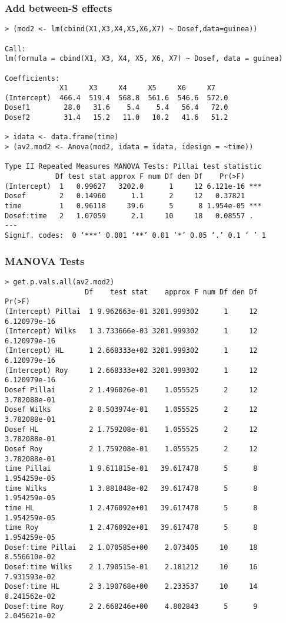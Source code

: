 \begin{frame}\frametitle{Add between-S effects}\scriptsize
\begin{verbatim}
> (mod2 <- lm(cbind(X1,X3,X4,X5,X6,X7) ~ Dosef,data=guinea))

Call:
lm(formula = cbind(X1, X3, X4, X5, X6, X7) ~ Dosef, data = guinea)

Coefficients:
             X1     X3     X4     X5     X6     X7   
(Intercept)  466.4  519.4  568.8  561.6  546.6  572.0
Dosef1        28.0   31.6    5.4    5.4   56.4   72.0
Dosef2        31.4   15.2   11.0   10.2   41.6   51.2

> idata <- data.frame(time)
> (av2.mod2 <- Anova(mod2, idata = idata, idesign = ~time))

Type II Repeated Measures MANOVA Tests: Pillai test statistic
            Df test stat approx F num Df den Df    Pr(>F)    
(Intercept)  1   0.99627   3202.0      1     12 6.121e-16 ***
Dosef        2   0.14960      1.1      2     12   0.37821    
time         1   0.96118     39.6      5      8 1.954e-05 ***
Dosef:time   2   1.07059      2.1     10     18   0.08557 .  
---
Signif. codes:  0 ‘***’ 0.001 ‘**’ 0.01 ‘*’ 0.05 ‘.’ 0.1 ‘ ’ 1
\end{verbatim}
\end{frame}

\begin{frame}[fragile]\frametitle{MANOVA Tests}\scriptsize
\begin{verbatim}
> get.p.vals.all(av2.mod2)
                   Df    test stat    approx F num Df den Df       Pr(>F)
(Intercept) Pillai  1 9.962663e-01 3201.999302      1     12 6.120979e-16
(Intercept) Wilks   1 3.733666e-03 3201.999302      1     12 6.120979e-16
(Intercept) HL      1 2.668333e+02 3201.999302      1     12 6.120979e-16
(Intercept) Roy     1 2.668333e+02 3201.999302      1     12 6.120979e-16
Dosef Pillai        2 1.496026e-01    1.055525      2     12 3.782088e-01
Dosef Wilks         2 8.503974e-01    1.055525      2     12 3.782088e-01
Dosef HL            2 1.759208e-01    1.055525      2     12 3.782088e-01
Dosef Roy           2 1.759208e-01    1.055525      2     12 3.782088e-01
time Pillai         1 9.611815e-01   39.617478      5      8 1.954259e-05
time Wilks          1 3.881848e-02   39.617478      5      8 1.954259e-05
time HL             1 2.476092e+01   39.617478      5      8 1.954259e-05
time Roy            1 2.476092e+01   39.617478      5      8 1.954259e-05
Dosef:time Pillai   2 1.070585e+00    2.073405     10     18 8.556610e-02
Dosef:time Wilks    2 1.790515e-01    2.181212     10     16 7.931593e-02
Dosef:time HL       2 3.190768e+00    2.233537     10     14 8.241562e-02
Dosef:time Roy      2 2.668246e+00    4.802843      5      9 2.045621e-02  

\end{verbatim}

\end{frame}


